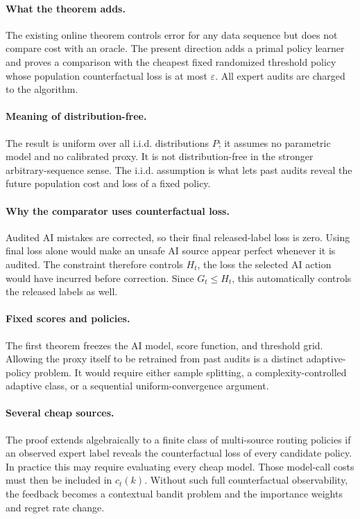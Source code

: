 \documentclass[11pt]{article}
\newcommand{\eps}{\varepsilon}
\begin{document}
\paragraph{What the theorem adds.}
The existing online theorem controls error for any data sequence but does not
compare cost with an oracle.  The present direction adds a primal policy
learner and proves a comparison with the cheapest fixed randomized threshold
policy whose population counterfactual loss is at most $\eps$.  All expert
audits are charged to the algorithm.

\paragraph{Meaning of distribution-free.}
The result is uniform over all i.i.d. distributions $P$; it assumes no
parametric model and no calibrated proxy.  It is not distribution-free in the
stronger arbitrary-sequence sense.  The i.i.d. assumption is what lets past
audits reveal the future population cost and loss of a fixed policy.

\paragraph{Why the comparator uses counterfactual loss.}
Audited AI mistakes are corrected, so their final released-label loss is zero.
Using final loss alone would make an unsafe AI source appear perfect whenever
it is audited.  The constraint therefore controls $H_t$, the loss the selected
AI action would have incurred before correction.  Since $G_t\le H_t$, this
automatically controls the released labels as well.

\paragraph{Fixed scores and policies.}
The first theorem freezes the AI model, score function, and threshold grid.
Allowing the proxy itself to be retrained from past audits is a distinct
adaptive-policy problem.  It would require either sample splitting, a
complexity-controlled adaptive class, or a sequential uniform-convergence
argument.

\paragraph{Several cheap sources.}
The proof extends algebraically to a finite class of multi-source routing
policies if an observed expert label reveals the counterfactual loss of every
candidate policy.  In practice this may require evaluating every cheap model.
Those model-call costs must then be included in $c_t(k)$.  Without such full
counterfactual observability, the feedback becomes a contextual bandit problem
and the importance weights and regret rate change.
\end{document}
